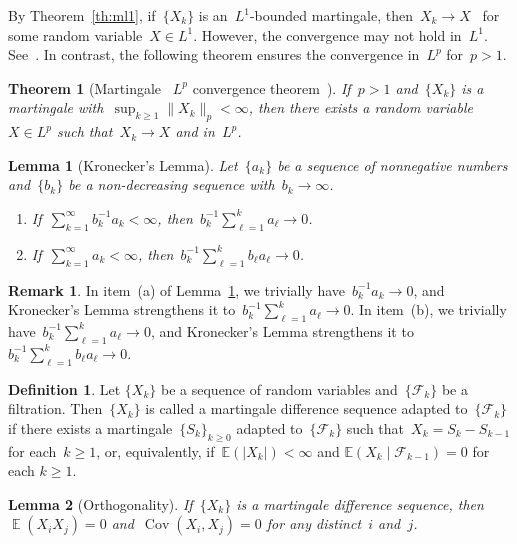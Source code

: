 \documentclass[12pt,a4paper]{article}  %
\newcounter{cite}
\newtheorem{theorem}{Theorem}[section]
\newtheorem{lemma}{Lemma}[section]
\theoremstyle{definition}
\newtheorem{definition}{Definition}[section]
\newtheorem{remark}{Remark}[section]
\numberwithin{equation}{section}
\newcommand{\FF}{\mathcal{F}}
\newcommand{\as}{{\text{a.s.}}\xspace}
\DeclareMathOperator{\cov}{Cov}
\DeclareMathOperator{\expc}{\mathbb{E}}
\begin{document}
By Theorem~\ref{th:ml1}, if~$\{X_k\}$ is an~$L^1$-bounded martingale,
then~$X_k\to X$~\as for some random variable~$X\in L^1$. However, the convergence may not hold
in~$L^1$. See~\cite[Example~4.2.13]{Durrett_2019}. In contrast, the following theorem ensures
the convergence in~$L^p$ for~$p>1$.

\begin{theorem}[Martingale ~$L^p$ convergence theorem~\mbox{\cite[Theorem~4.4.6]{Durrett_2019}}] \label{th:mlp}
    If~$p> 1$ and~$\{X_k\}$ is a martingale with~$\sup_{k\ge 1} \|X_k\|_p< \infty$,
    then there exists a random variable~$X\in L^p$ such that~$X_k\to X$ \as and in~$L^p$.
\end{theorem}

\begin{lemma}[Kronecker's Lemma]
    \label{lem:kronecker}
    Let~$\{a_k\}$ be a sequence of nonnegative numbers and~$\{b_k\}$ be a non-decreasing sequence
    with~$b_k\to \infty$.
    \begin{enumerate}
        \item If~$\sum_{k=1}^\infty b_k^{-1}a_k < \infty$, then~$b_k^{-1}\sum_{\ell=1}^k a_\ell\to 0$.
        \item If~$\sum_{k=1}^\infty a_k < \infty$, then~$b_k^{-1}\sum_{\ell=1}^k b_\ell a_\ell\to 0$.
    \end{enumerate}
\end{lemma}

\begin{remark}
    \label{rem:kronecker}
    In item~(a) of Lemma~\ref{lem:kronecker}, we trivially have~$b_k^{-1} a_k\to 0$,
    and Kronecker's Lemma strengthens it to~$b_k^{-1}\sum_{\ell=1}^k a_\ell\to 0$.
    In item~(b), we trivially have~$b_k^{-1} \sum_{\ell=1}^k a_\ell\to 0$,
    and Kronecker's Lemma strengthens it to~$b_k^{-1}\sum_{\ell=1}^k b_\ell a_\ell\to 0$.
\end{remark}

\begin{definition}
    \label{def:md}
    Let $\{X_k\}$ be a sequence of random variables and~$\{\FF_k\}$ be a filtration.
    Then~$\{X_k\}$ is called a martingale difference sequence
    adapted to~$\{\FF_k\}$ if there exists a martingale~$\{S_k\}_{k\ge 0}$ adapted to~$\{\FF_k\}$
    such that~$X_k = S_k - S_{k-1}$ for each~$k\ge 1$, or, equivalently,
    if~$\mathbb{E}(|X_k|) < \infty$ and $\mathbb{E}(X_k \mathrel{|} \FF_{k-1}) = 0$ \as for each $k \ge 1$.
\end{definition}

\begin{lemma}[Orthogonality]
    \label{lem:orth}
    If~$\{X_k\}$ is a martingale difference sequence, then
    $\expc(X_iX_j) = 0$ and~$\cov(X_i, X_j) = 0$ for any distinct~$i$ and~$j$.
\end{lemma}
\end{document}
